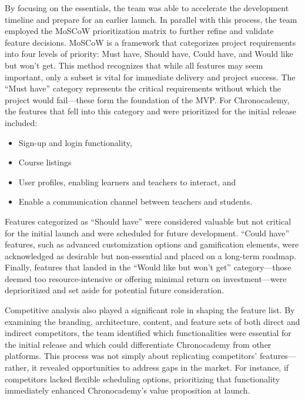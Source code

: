 By focusing on the essentials, the team was able to accelerate the development timeline and prepare for an earlier launch.
In parallel with this process, the team employed the MoSCoW prioritization matrix to further refine and validate feature decisions.
MoSCoW is a framework that categorizes project requirements into four levels of priority: Must have, Should have, Could have, and Would like but won’t get.
This method recognizes that while all features may seem important, only a subset is vital for immediate delivery and project success.\cite[Moscow Matrix]{moscowMatrix}
The ``Must have'' category represents the critical requirements without which the project would fail—these form the foundation of the MVP. For Chronocademy, the features that fell into this category and were prioritized for the initial release included:

\begin{itemize}
    \item Sign-up and login functionality,
    \item Course listings
    \item User profiles, enabling learners and teachers to interact, and
    \item Enable a communication channel between teachers and students.
\end{itemize}
Features categorized as ``Should have'' were considered valuable but not critical for the initial launch and were scheduled for future development.
``Could have'' features, such as advanced customization options and gamification elements, were acknowledged as desirable but non-essential and placed on a long-term roadmap.
Finally, features that landed in the ``Would like but won’t get'' category—those deemed too resource-intensive or offering minimal return on investment—were deprioritized and set aside for potential future consideration.

Competitive analysis also played a significant role in shaping the feature list.
By examining the branding, architecture, content, and feature sets of both direct and indirect competitors, the team identified which functionalities were essential for the initial release and which could differentiate Chronocademy from other platforms.
This process was not simply about replicating competitors’ features—rather, it revealed opportunities to address gaps in the market.
For instance, if competitors lacked flexible scheduling options, prioritizing that functionality immediately enhanced Chronocademy’s value proposition at launch.

